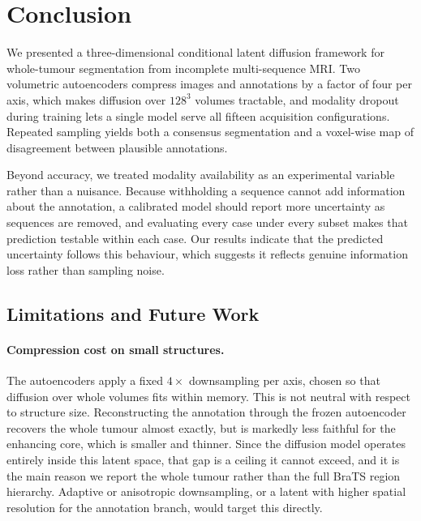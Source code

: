 %

\section{Conclusion}
\label{sec:conclusion}

We presented a three-dimensional conditional latent diffusion framework for
whole-tumour segmentation from incomplete multi-sequence MRI. Two volumetric
autoencoders compress images and annotations by a factor of four per axis,
which makes diffusion over $128^{3}$ volumes tractable, and modality dropout
during training lets a single model serve all fifteen acquisition
configurations. Repeated sampling yields both a consensus segmentation and a
voxel-wise map of disagreement between plausible annotations.

Beyond accuracy, we treated modality availability as an experimental variable
rather than a nuisance. Because withholding a sequence cannot add information
about the annotation, a calibrated model should report more uncertainty as
sequences are removed, and evaluating every case under every subset makes that
prediction testable within each case. Our results indicate that the predicted
uncertainty follows this behaviour, which suggests it reflects genuine
information loss rather than sampling noise. %

\subsection{Limitations and Future Work}
\label{subsec:limitations}

\paragraph{Compression cost on small structures.}
The autoencoders apply a fixed $4\times$ downsampling per axis, chosen so that
diffusion over whole volumes fits within memory. This is not neutral with
respect to structure size. Reconstructing the annotation through the frozen
autoencoder recovers the whole tumour almost exactly, but is markedly less
faithful for the enhancing core, which is smaller and thinner. Since the
diffusion model operates entirely inside this latent space, that gap is a
ceiling it cannot exceed, and it is the main reason we report the whole tumour
rather than the full BraTS region hierarchy. Adaptive or anisotropic
downsampling, or a latent with higher spatial resolution for the annotation
branch, would target this directly.

